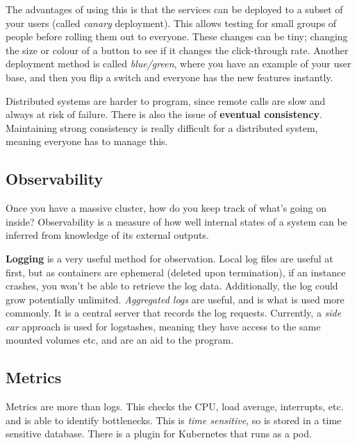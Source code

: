 \documentclass[11pt,a4paper,titlepage,dvipsnames,cmyk]{scrartcl}
\begin{document}
The advantages of using this is that the services can be deployed to a subset of your users (called \textit{canary} deployment). This allows testing for small groups of people before rolling them out to everyone. These changes can be tiny; changing the size or colour of a button to see if it changes the click-through rate. Another deployment method is called \textit{blue/green}, where you have an example of your user base, and then you flip a switch and everyone has the new features instantly.

Distributed systems are harder to program, since remote calls are slow and always at risk of failure. There is also the issue of \textbf{eventual consistency}. Maintaining strong consistency is really difficult for a distributed system, meaning everyone has to manage this.

\subsection{Observability}
Once you have a massive cluster, how do you keep track of what's going on inside? Observability is a measure of how well internal states of a system can be inferred from knowledge of its external outputs.

\textbf{Logging} is a very useful method for observation. Local log files are useful at first, but as containers are ephemeral (deleted upon termination), if an instance crashes, you won't be able to retrieve the log data. Additionally, the log could grow potentially unlimited. \textit{Aggregated logs} are useful, and is what is used more commonly. It is a central server that records the log requests. Currently, a \textit{side car} approach is used for logstashes, meaning they have access to the same mounted volumes etc, and are an aid to the program.

\subsection{Metrics}
Metrics are more than logs. This checks the CPU, load average, interrupts, etc. and is able to identify bottlenecks. This is \textit{time sensitive}, so is stored in a time sensitive database. There is a plugin for Kubernetes that runs as a pod.
\end{document}
